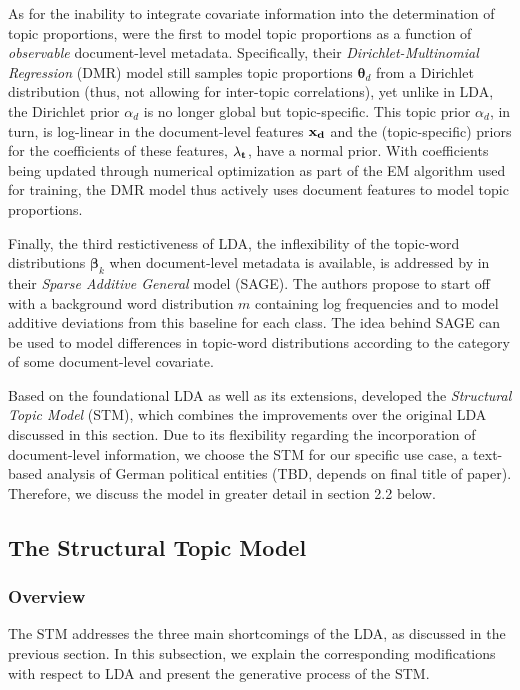\documentclass[12pt]{article}
\begin{document}
As for the inability to integrate covariate information into the determination of topic proportions, \cite{mimno2011optimizing} were the first to model topic proportions as a function of \textit{observable} document-level metadata. Specifically, their \textit{Dirichlet-Multinomial Regression} (DMR) model still samples topic proportions $\boldsymbol{\theta}_d$ from a Dirichlet distribution (thus, not allowing for inter-topic correlations), yet unlike in LDA, the Dirichlet prior $\alpha_d$ is no longer global but topic-specific. This topic prior $\alpha_d$, in turn, is log-linear in the document-level features $\bf{x_d}$ and the (topic-specific) priors for the coefficients of these features, $\bf{\lambda_t}$, have a normal prior. With coefficients being updated through numerical optimization as part of the EM algorithm used for training, the DMR model thus actively uses document features to model topic proportions. 

Finally, the third restictiveness of LDA, the inflexibility of the topic-word distributions $\boldsymbol{\beta}_k$ when document-level metadata is available, is addressed by \cite{eisenstein2011sparse} in their \textit{Sparse Additive General} model (SAGE). The authors propose to start off with a background word distribution $m$ containing log frequencies and to model additive deviations from this baseline for each class. The idea behind SAGE can be used to model differences in topic-word distributions according to the category of some document-level covariate.

Based on the foundational LDA as well as its extensions, \cite{roberts2013structural} developed the \textit{Structural Topic Model} (STM), which combines the improvements over the original LDA discussed in this section. Due to its flexibility regarding the incorporation of document-level information, we choose the STM for our specific use case, a text-based analysis of German political entities (TBD, depends on final title of paper). Therefore, we discuss the model in greater detail in section 2.2 below.

\subsection{The Structural Topic Model}

\subsubsection*{Overview}

The STM addresses the three main shortcomings of the LDA, as discussed in the previous section. In this subsection, we explain the corresponding modifications with respect to LDA and present the generative process of the STM.
\end{document}
